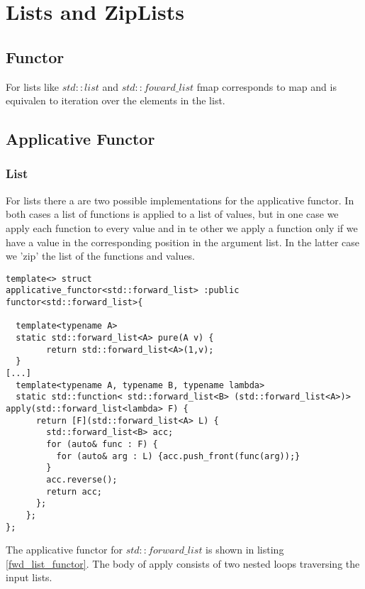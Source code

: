 \documentclass[12pt,fleqn]{article}
\begin{document}
\section{Lists and ZipLists}
%
%
\subsection{Functor}

For lists like $std::list$ and $std::foward\_list$ fmap corresponds to map and is equivalen to iteration over the elements in the list.

  
%
%
\subsection{Applicative Functor}
%
%

\subsubsection{List}
%
For lists there a are two possible implementations for the applicative functor.
In both cases a list of functions is applied to a list of values, but in one case we apply each function to every value and in te other we apply a function 
only if we have a value in the corresponding position in the argument list. 
In the latter case we 'zip' the list of the functions and values.

%
%
\begin{minipage}{\linewidth}
\begin{lstlisting}[caption=std::forward\_list is an applicative functor, label=fwd_list_functor]
template<> struct 
applicative_functor<std::forward_list> :public functor<std::forward_list>{

  template<typename A>
  static std::forward_list<A> pure(A v) {
		return std::forward_list<A>(1,v);
  }
[...]
  template<typename A, typename B, typename lambda>
  static std::function< std::forward_list<B> (std::forward_list<A>)> apply(std::forward_list<lambda> F) {
      return [F](std::forward_list<A> L) {
	    std::forward_list<B> acc;
	    for (auto& func : F) {
	      for (auto& arg : L) {acc.push_front(func(arg));}
        } 
	    acc.reverse();
	    return acc;
      };
    };
};
\end{lstlisting}
\end{minipage}
%
%
%
The applicative functor for $std::forward\_list$ is shown in listing \ref{fwd_list_functor}.
The body of apply consists of two nested loops traversing the input lists. 
%
\end{document}
